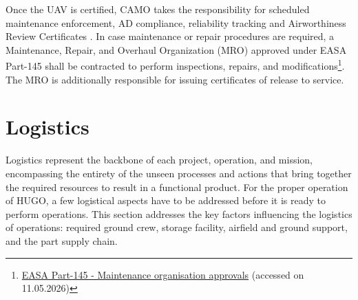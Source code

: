 Once the UAV is certified, CAMO takes the responsibility for scheduled maintenance enforcement, AD compliance, reliability tracking and Airworthiness Review Certificates \cite{EASA_CAirworthiness}. In case maintenance or repair procedures are required, a Maintenance, Repair, and Overhaul Organization (MRO) approved under EASA Part-145 shall be contracted to perform inspections, repairs, and modifications\footnote{\href{https://www.easa.europa.eu/en/acceptable-means-compliance-and-guidance-material-group/part-145-maintenance-organisation-approvals}{EASA Part-145 - Maintenance organisation approvals} (accessed on 11.05.2026)}. The MRO is additionally responsible for issuing certificates of release to service.









\section{Logistics}
\label{sec:logistics}
Logistics represent the backbone of each project, operation, and mission, encompassing the entirety of the unseen processes and actions that bring together the required resources to result in a functional product. For the proper operation of HUGO, a few logistical aspects have to be addressed before it is ready to perform operations. This section addresses the key factors influencing the logistics of operations: required ground crew, storage facility, airfield and ground support, and the part supply chain.




